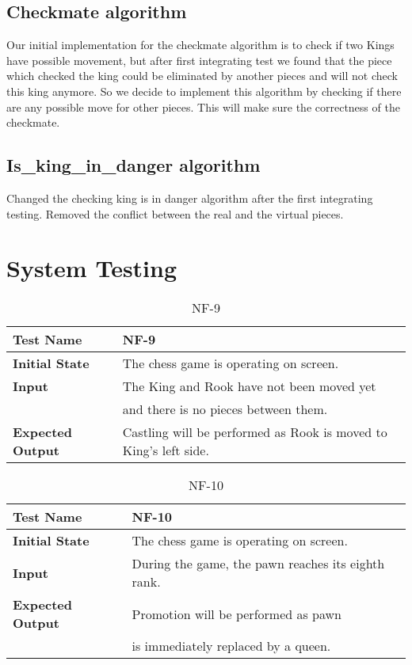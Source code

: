 \documentclass[12pt, titlepage]{article}
\begin{document}
\subsection{Checkmate algorithm}
Our initial implementation for the checkmate algorithm is to check if two Kings have possible movement, but after first integrating test we found that the piece which checked the king could be eliminated by another pieces and will not check this king anymore. So we decide to implement this algorithm by checking if there are any possible move for other pieces. This will make sure the correctness of the checkmate. \\
\subsection{Is\_king\_in\_danger algorithm}
Changed the checking king is in danger algorithm after the first integrating testing. Removed the conflict between the real and the virtual pieces.  

\section{System Testing}
\begin{table}[!htbp]
\begin{tabular}[r]{|l|l|}
\hline
\textbf{Test Name} & NF-9 \\ 
\hline
\textbf{Initial State} & The chess game is operating on screen. \\ 
\hline
\textbf{Input} & The King and Rook have not been moved yet\\
		      &and there is no pieces between them.\\ 
\hline 
\textbf{Expected Output} & Castling will be performed as Rook is moved to King's left side.\\ 
\hline
\end{tabular}
\caption{NF-9}
\label{Table}
\end{table}

\begin{table}[!htbp]
\begin{tabular}[r]{|l|l|}
\hline
\textbf{Test Name} & NF-10 \\ 
\hline
\textbf{Initial State} & The chess game is operating on screen.\\ 
\hline
\textbf{Input} & During the game, the pawn reaches its eighth rank.\\ 
\hline 
\textbf{Expected Output} & Promotion will be performed as pawn\\
				        &is immediately replaced by a queen.\\ 
\hline
\end{tabular}
\caption{NF-10}
\label{Table}
\end{table}
\end{document}
